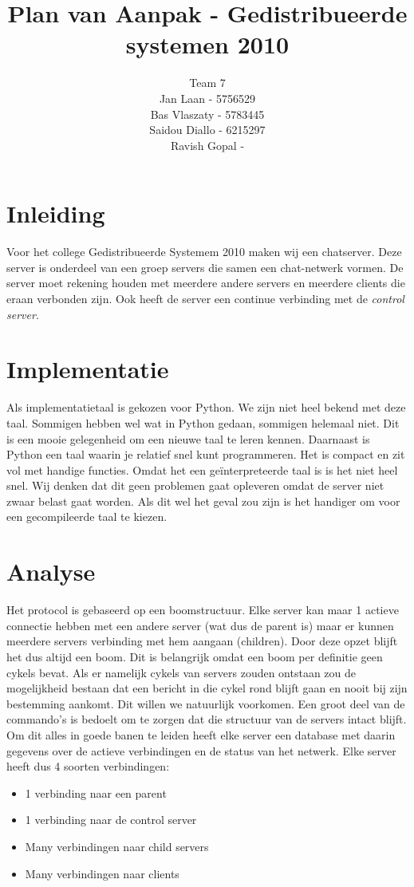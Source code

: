 \documentclass[a4paper,10pt]{article}
\title{Plan van Aanpak - Gedistribueerde systemen 2010}
\author{Team 7 \\
Jan Laan - 5756529\\
Bas Vlaszaty - 5783445 \\
Saidou Diallo - 6215297\\
Ravish Gopal - }
\begin{document}
  \maketitle
  \newpage
  \section{Inleiding}
  Voor het college Gedistribueerde Systemem 2010 maken wij een chatserver. Deze server is onderdeel van een groep servers die samen een chat-netwerk vormen. De server moet rekening houden met meerdere andere servers en meerdere clients die eraan verbonden zijn. Ook heeft de server een continue verbinding met de \textit{control server}.
  
  \section{Implementatie}
  Als implementatietaal is gekozen voor Python. We zijn niet heel bekend met deze taal. Sommigen hebben wel wat in Python gedaan, sommigen helemaal niet. Dit is een mooie gelegenheid om een nieuwe taal te leren kennen. Daarnaast is Python een taal waarin je relatief snel kunt programmeren. Het is compact en zit vol met handige functies. Omdat het een ge\"interpreteerde taal is is het niet heel snel. Wij denken dat dit geen problemen gaat opleveren omdat de server niet zwaar belast gaat worden. Als dit wel het geval zou zijn is het handiger om voor een gecompileerde taal te kiezen.

  \section{Analyse}
  Het protocol is gebaseerd op een boomstructuur. Elke server kan maar 1 actieve connectie hebben met een andere server (wat dus de parent is) maar er kunnen meerdere servers verbinding met hem aangaan (children). Door deze opzet blijft het dus altijd een boom. Dit is belangrijk omdat een boom per definitie geen cykels bevat. Als er namelijk cykels van servers zouden ontstaan zou de mogelijkheid bestaan dat een bericht in die cykel rond blijft gaan en nooit bij zijn bestemming aankomt. Dit willen we natuurlijk voorkomen. Een groot deel van de commando’s is bedoelt om te zorgen dat die structuur van de servers intact blijft. Om dit alles in goede banen te leiden heeft elke server een database met daarin gegevens over de actieve verbindingen en de status van het netwerk. Elke server heeft dus 4 soorten verbindingen:
\begin{itemize}
\item 1 verbinding naar een parent
\item 1 verbinding naar de control server
\item Many verbindingen naar child servers
\item Many verbindingen naar clients
\end{itemize}
\end{document}
